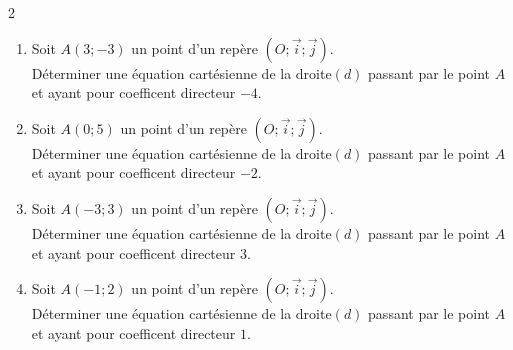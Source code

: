 {%
\begin{Exercice}
\leavevmode\vspace{-\baselineskip}
\vspace{-0.5cm}
\begin{multicols}{2}
\begin{enumerate}[itemsep=1em]
	\item \begin{minipage}[t]{\linewidth}Soit $A(3;-3)$ un point d'un repère $(O ; \overrightarrow{i} ;\overrightarrow{j})$.\\Déterminer une équation cartésienne de la droite$(d)$ passant par le point $A$ et ayant pour coefficent directeur $-4$.\end{minipage}
	\item \begin{minipage}[t]{\linewidth}Soit $A(0;5)$ un point d'un repère $(O ; \overrightarrow{i} ;\overrightarrow{j})$.\\Déterminer une équation cartésienne de la droite$(d)$ passant par le point $A$ et ayant pour coefficent directeur $-2$.\end{minipage}
	\item \begin{minipage}[t]{\linewidth}Soit $A(-3;3)$ un point d'un repère $(O ; \overrightarrow{i} ;\overrightarrow{j})$.\\Déterminer une équation cartésienne de la droite$(d)$ passant par le point $A$ et ayant pour coefficent directeur $3$.\end{minipage}
	\item \begin{minipage}[t]{\linewidth}Soit $A(-1;2)$ un point d'un repère $(O ; \overrightarrow{i} ;\overrightarrow{j})$.\\Déterminer une équation cartésienne de la droite$(d)$ passant par le point $A$ et ayant pour coefficent directeur $1$.\end{minipage}
\end{enumerate}
\end{multicols}
\end{Exercice}

\newpage

}
